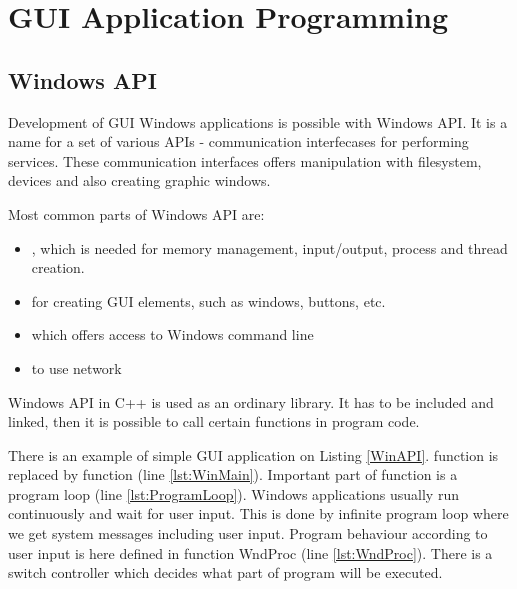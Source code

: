 \chapter*{GUI Application Programming}
\vspace{-10mm}

\section*{Windows API}

Development of GUI Windows applications is possible with Windows API. It is a name for a set of various APIs - communication interfecases for performing services. These communication interfaces offers manipulation with filesystem, devices and also creating graphic windows.

Most common parts of Windows API are:
\begin{itemize}
\item {}, which is needed for memory management, input/output, process and thread creation.
\item {} for creating GUI elements, such as windows, buttons, etc.
\item {} which offers access to Windows command line
\item {} to use network
\end{itemize}

Windows API in C++ is used as an ordinary library. It has to be included and linked, then it is possible to call certain functions in program code.

There is an example of simple GUI application on Listing \ref{WinAPI}.  function is replaced by  function (line \ref{lst:WinMain}). Important part of  function is a program loop (line \ref{lst:ProgramLoop}). Windows applications usually run continuously and wait for user input. This is done by infinite program loop where we get system messages including user input. Program behaviour according to user input is here defined in function WndProc (line \ref{lst:WndProc}). There is a switch controller which decides what part of program will be executed.

